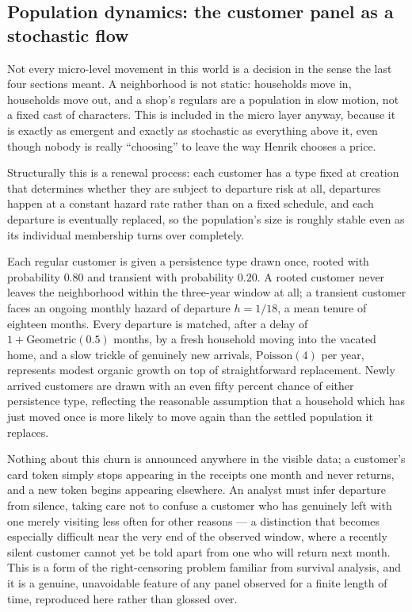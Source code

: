 \documentclass[12pt,a4paper]{article}
\begin{document}
\subsection{Population dynamics: the customer panel as a stochastic flow}
\label{sec:micro-panel}

Not every micro-level movement in this world is a decision in the sense
the last four sections meant. A neighborhood is not static: households
move in, households move out, and a shop's regulars are a population
in slow motion, not a fixed cast of characters. This is included in the
micro layer anyway, because it is exactly as emergent and exactly as
stochastic as everything above it, even though nobody is really
``choosing'' to leave the way Henrik chooses a price.

Structurally this is a renewal process: each customer has a type fixed
at creation that determines whether they are subject to departure risk
at all, departures happen at a constant hazard rate rather than on a
fixed schedule, and each departure is eventually replaced, so the
population's size is roughly stable even as its individual membership
turns over completely.

Each regular customer is given a persistence type drawn once,
rooted with probability $0.80$ and transient with probability $0.20$. A
rooted customer never leaves the neighborhood within the three-year
window at all; a transient customer faces an ongoing monthly hazard of
departure $h = 1/18$, a mean tenure of eighteen months. Every departure
is matched, after a delay of $1 + \text{Geometric}(0.5)$ months, by a
fresh household moving into the vacated home, and a slow trickle of
genuinely new arrivals, $\text{Poisson}(4)$ per year, represents modest
organic growth on top of straightforward replacement. Newly arrived
customers are drawn with an even fifty percent chance of either
persistence type, reflecting the reasonable assumption that a household
which has just moved once is more likely to move again than the settled
population it replaces.

Nothing about this churn is announced anywhere in the visible data; a
customer's card token simply stops appearing in the receipts one month
and never returns, and a new token begins appearing elsewhere. An
analyst must infer departure from silence, taking care not to confuse a
customer who has genuinely left with one merely visiting less often for
other reasons --- a distinction that becomes especially difficult near
the very end of the observed window, where a recently silent customer
cannot yet be told apart from one who will return next month. This is a
form of the right-censoring problem familiar from survival analysis, and
it is a genuine, unavoidable feature of any panel observed for a finite
length of time, reproduced here rather than glossed over.
\end{document}
